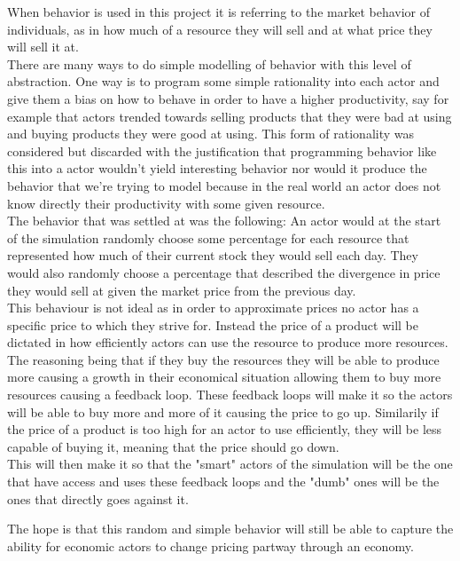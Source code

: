 \documentclass[11p]{article}
\begin{document}
When behavior is used in this project it is referring to the market behavior of individuals, as in how much of a resource they will sell and at what price they will sell it at.
\\

There are many ways to do simple modelling of behavior with this level of abstraction. One way is to program some simple rationality into each actor and give them a bias on how to behave in order to have a higher productivity, say for example that actors trended towards selling products that they were bad at using and buying products they were good at using. This form of rationality was considered but discarded with the justification that programming behavior like this into a actor wouldn't yield interesting behavior nor would it produce the behavior that we're trying to model because in the real world an actor does not know directly their productivity with some given resource. 
\\

The behavior that was settled at was the following: An actor would at the start of the simulation randomly choose some percentage for each resource that represented how much of their current stock they would sell each day. They would also randomly choose a percentage that described the divergence in price they would sell at given the market price from the previous day.
\\

This behaviour is not ideal as in order to approximate prices no actor has a specific price to which they strive for. Instead the price of a product will be dictated in how efficiently actors can use the resource to produce more resources. The reasoning being that if they buy the resources they will be able to produce more causing a growth in their economical situation allowing them to buy more resources causing a feedback loop. These feedback loops will make it so the actors will be able to buy more and more of it causing the price to go up. Similarily if the price of a product is too high for an actor to use efficiently, they will be less capable of buying it, meaning that the price should go down.
\\
This will then make it so that the "smart" actors of the simulation will be the one that have access and uses these feedback loops and the "dumb" ones will be the ones that directly goes against it.

The hope is that this random and simple behavior will still be able to  capture the ability for economic actors to change pricing partway through an economy. 
\end{document}
